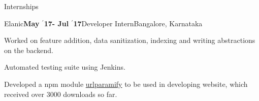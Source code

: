 \documentclass{resume} %
\begin{document}

\begin{rSection}{Internships}

\begin{rSubsection}{\large Elanic}{\textbf{\large May $^{\prime}$17- Jul $^{\prime}$17}}{Developer Intern}{Bangalore, Karnataka}
\item Worked on feature addition, data sanitization, indexing and writing abstractions on the backend.
\item Automated testing suite using Jenkins.
\item Developed a npm module \href{https://www.npmjs.com/package/urlparamify}{urlparamify} to be used in developing website, which received over 3000 downloads so far.
\end{rSubsection}


\end{rSection}

\end{document}
